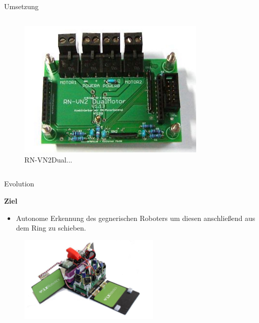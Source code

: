 \documentclass{beamer}
\begin{document}
\begin{frame}{Umsetzung}
\begin{columns}
\begin{column}{0.3\textwidth}
\begin{figure}
		\centering
		\includegraphics[width=0.8\textwidth]{./images/rn-vnh2dualmotor.jpg}
		\caption{RN-VN2Dual...\cite{Image:RNVN2DualMotor}}
	\end{figure}
	\end{column}
\end{columns}
\end{frame}
\begin{frame}{Evolution}
\begin{large}\textbf{Ziel}\end{large}
\begin{itemize}
	\item Autonome Erkennung des gegnerischen Roboters um diesen anschlie\ss{}end aus dem Ring zu schieben.
\end{itemize}
 \begin{figure}[H]
  \centering
  \includegraphics[width=0.6\textwidth]{./images/robot-evolution.jpg}
 \end{figure}
\end{frame}
\end{document}
